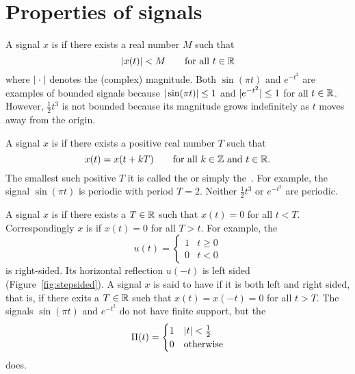 \section{Properties of signals}\label{sec:properties-signals}

A signal $x$ is  if there exists a real number $M$ such that 
\[
\vert x(t) \vert < M \qquad \text{for all $t \in {\mathbb R}$} 
\]
where $\vert \cdot \vert$ denotes the (complex) magnitude.  Both $\sin( \pi t)$ and $e^{-t^2}$ are examples of bounded signals because $\vert \sin( \pi t) \vert \leq 1$ and $\vert e^{-t^2} \vert \leq 1$ for all $t \in {\mathbb R}$.  However, $\frac{1}{2}t^3$ is not bounded because its magnitude grows indefinitely as $t$ moves away from the origin.  %

A signal $x$ is  if there exists a positive real number $T$ such that
\[
x(t) = x(t + kT) \qquad \text{for all $k \in {\mathbb Z}$ and $t \in {\mathbb R}$.}
\]
The smallest such positive $T$ it is called the  or simply the~.  For example, the signal $\sin( \pi t)$ is periodic with period $T=2$.  Neither $\frac{1}{2}t^3$ or $e^{-t^2}$ are periodic.  %

A signal $x$ is  if there exists a $T \in {\mathbb R}$ such that $x(t) = 0$ for all $t < T$.  Correspondingly $x$ is  if $x(t) = 0$ for all $T > t$.  For example, the  
\begin{equation} \label{eq:stepfunction}
u(t) = \begin{cases}
1 & t \geq 0 \\
0 & t < 0
\end{cases}
\end{equation}
is right-sided.  Its horizontal reflection $u(-t)$ is left sided (Figure~\ref{fig:stepsided}).  A signal $x$ is said to have  if it is both left and right sided, that is, if there exits a $T\in{\mathbb R}$ such that $x(t) = x(-t) = 0$ for all $t > T$.  The signals $\sin( \pi t)$ and $e^{-t^2}$ do not have finite support, but the 
\begin{equation}\label{eq:rectfuncdefn}
\Pi(t) = \begin{cases} 
1 & \left\vert t \right\vert < \frac{1}{2}\\
0 & \text{otherwise}
\end{cases}
\end{equation}
does.

